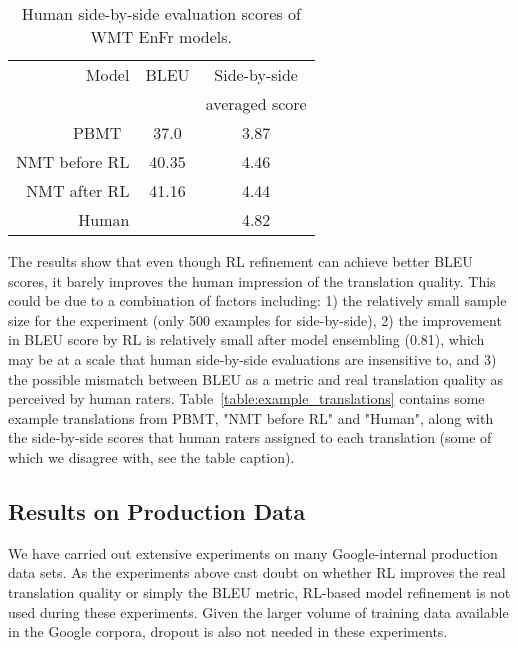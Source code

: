 \begin{table}[h!]
\caption{Human side-by-side evaluation scores of WMT EnFr models.}
\centering
\begin{tabular}{r c c}
\hline\hline Model & BLEU & Side-by-side \\
      &      & averaged score \\ \hline
	PBMT~\cite{durrani2014edinburgh} & 37.0 & 3.87 \\ NMT before RL & 40.35 & 4.46 \\
	NMT after RL & 41.16 & 4.44 \\ \hline Human &  & 4.82 \\ \hline \end{tabular}
\label{table:wmt_en_fr_sxs}
\end{table}


The results show that even though RL refinement can achieve better
BLEU scores, it barely improves the human impression of the translation
quality.  This could be due to a combination of factors including: 1)
the relatively small sample size for the experiment (only 500
examples for side-by-side), 2) the improvement in BLEU score by RL
is relatively small after model ensembling (0.81), which may be at a
scale that human side-by-side evaluations are insensitive to, and 3) the
possible 
mismatch between BLEU as a metric and real translation quality as perceived by
human raters. Table~\ref{table:example_translations} contains some example
translations from PBMT, "NMT before RL" and "Human", along with the
side-by-side scores that human raters assigned to each translation
(some of which we disagree with, see the table caption).








\subsection{Results on Production Data}

We have carried out extensive experiments on many Google-internal production
data sets.
As the experiments above cast doubt on whether RL improves the real translation
quality or simply the BLEU metric, RL-based model
refinement is not used during these experiments.
Given the larger volume of training data available in the Google corpora,
dropout is also not needed in these experiments.

